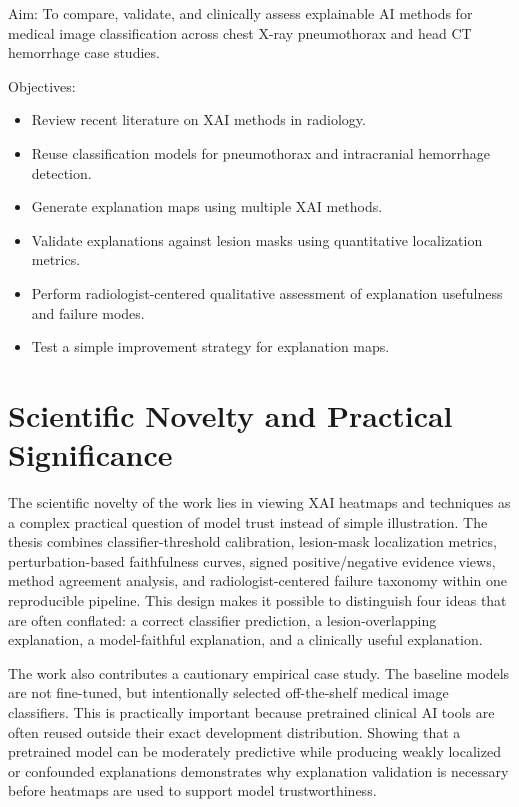 Aim: To compare, validate, and clinically assess explainable AI methods
for medical image classification across chest X-ray pneumothorax and
head CT hemorrhage case studies.

Objectives:
\begin{itemize}
\item Review recent literature on XAI methods in radiology.
\item Reuse classification models for pneumothorax and intracranial
hemorrhage detection.
\item Generate explanation maps using multiple XAI methods.
\item Validate explanations against lesion masks using quantitative
localization metrics.
\item Perform radiologist-centered qualitative assessment of explanation
usefulness and failure modes.
\item Test a simple improvement strategy for explanation maps.
\end{itemize}

\hypertarget{scientific-novelty-and-practical-significance}{%
	\section{Scientific Novelty and Practical
		Significance}\label{scientific-novelty-and-practical-significance}}

The scientific novelty of the work lies in viewing XAI heatmaps and techniques
as a complex practical question of model trust instead of simple illustration. 
The thesis combines classifier-threshold calibration,
lesion-mask localization metrics, perturbation-based faithfulness
curves, signed positive/negative evidence views, method agreement
analysis, and radiologist-centered failure taxonomy within one
reproducible pipeline. This design makes it possible to distinguish four
ideas that are often conflated: a correct classifier prediction, a
lesion-overlapping explanation, a model-faithful explanation, and a
clinically useful explanation.

The work also contributes a cautionary empirical case study. The
baseline models are not fine-tuned, but intentionally selected 
off-the-shelf medical image classifiers. This is practically
important because pretrained clinical AI tools are often reused outside
their exact development distribution. Showing that a pretrained model
can be moderately predictive while producing weakly localized or
confounded explanations demonstrates why explanation validation 
is necessary before heatmaps are used to support model trustworthiness.

